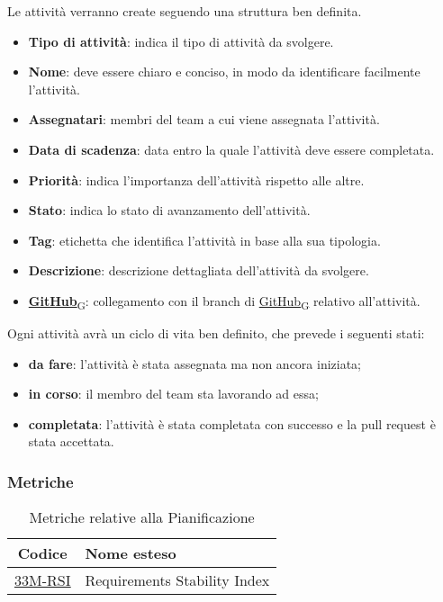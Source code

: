 Le attività verranno create seguendo una struttura ben definita.
\begin{itemize}
    \item \textbf{Tipo di attività}: indica il tipo di attività da svolgere.
    \item \textbf{Nome}: deve essere chiaro e conciso, in modo da identificare facilmente l'attività.
    \item \textbf{Assegnatari}: membri del team a cui viene assegnata l'attività.
    \item \textbf{Data di scadenza}: data entro la quale l'attività deve essere completata.
    \item \textbf{Priorità}: indica l'importanza dell'attività rispetto alle altre.
    \item \textbf{Stato}: indica lo stato di avanzamento dell'attività.
    \item \textbf{Tag}: etichetta che identifica l'attività in base alla sua tipologia.
    \item \textbf{Descrizione}: descrizione dettagliata dell'attività da svolgere.
    \item \href{https://7last.github.io/docs/rtb/documentazione-interna/glossario\#github}{\textbf{GitHub}\textsubscript{G}}: collegamento con il branch di \href{https://7last.github.io/docs/rtb/documentazione-interna/glossario\#github}{GitHub\textsubscript{G}} relativo all'attività.
\end{itemize}

Ogni attività avrà un ciclo di vita ben definito, che prevede i seguenti stati:
\begin{itemize}
    \item \textbf{da fare}: l'attività è stata assegnata ma non ancora iniziata;
    \item \textbf{in corso}: il membro del team sta lavorando ad essa;
    \item \textbf{completata}: l'attività è stata completata con successo e la pull request è stata accettata.
\end{itemize}

\newpage
\subsubsection{Metriche}
\begin{table}[!h]
	\centering
	\begin{tabular}{ | c | l | }
		\hline
		\textbf{Codice}                      & \textbf{Nome esteso}         \\
		\hline
        \underline{\hyperlink{33M}{33M-RSI}} & Requirements Stability Index \\
		\hline
	\end{tabular}
	\caption{Metriche relative alla Pianificazione}
\end{table}

